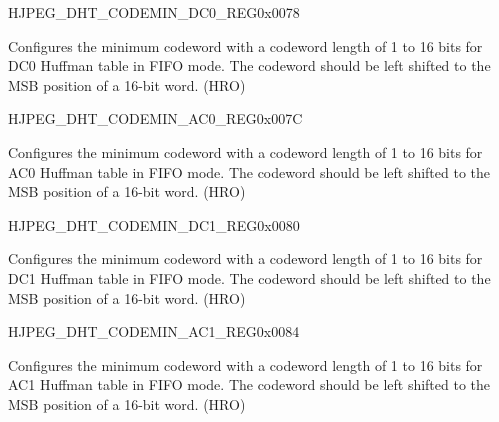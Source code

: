 \begin{register}{H}{JPEG\_DHT\_CODEMIN\_DC0\_REG}{0x0078}\label{regdesc:JPEGDHTCODEMINDC0REG}
%
\regnewline%
\begin{regdesc}\begin{reglist}
\label{fielddesc:JPEGDHTCODEMINDC0}\item [JPEG\_DHT\_CODEMIN\_DC0] Configures the minimum codeword with a codeword length of 1 to 16 bits for DC0 Huffman table in FIFO mode. The codeword should be left shifted to the MSB position of a 16-bit word. (HRO)
\end{reglist}\end{regdesc}
\end{register}


\begin{register}{H}{JPEG\_DHT\_CODEMIN\_AC0\_REG}{0x007C}\label{regdesc:JPEGDHTCODEMINAC0REG}
%
\regnewline%
\begin{regdesc}\begin{reglist}
\label{fielddesc:JPEGDHTCODEMINAC0}\item [JPEG\_DHT\_CODEMIN\_AC0] Configures the minimum codeword with a codeword length of 1 to 16 bits for AC0 Huffman table in FIFO mode. The codeword should be left shifted to the MSB position of a 16-bit word. (HRO)
\end{reglist}\end{regdesc}
\end{register}


\begin{register}{H}{JPEG\_DHT\_CODEMIN\_DC1\_REG}{0x0080}\label{regdesc:JPEGDHTCODEMINDC1REG}
%
\regnewline%
\begin{regdesc}\begin{reglist}
\label{fielddesc:JPEGDHTCODEMINDC1}\item [JPEG\_DHT\_CODEMIN\_DC1] Configures the minimum codeword with a codeword length of 1 to 16 bits for DC1 Huffman table in FIFO mode. The codeword should be left shifted to the MSB position of a 16-bit word. (HRO)
\end{reglist}\end{regdesc}
\end{register}


\begin{register}{H}{JPEG\_DHT\_CODEMIN\_AC1\_REG}{0x0084}\label{regdesc:JPEGDHTCODEMINAC1REG}
%
\regnewline%
\begin{regdesc}\begin{reglist}
\label{fielddesc:JPEGDHTCODEMINAC1}\item [JPEG\_DHT\_CODEMIN\_AC1] Configures the minimum codeword with a codeword length of 1 to 16 bits for AC1 Huffman table in FIFO mode. The codeword should be left shifted to the MSB position of a 16-bit word. (HRO)
\end{reglist}\end{regdesc}
\end{register}


